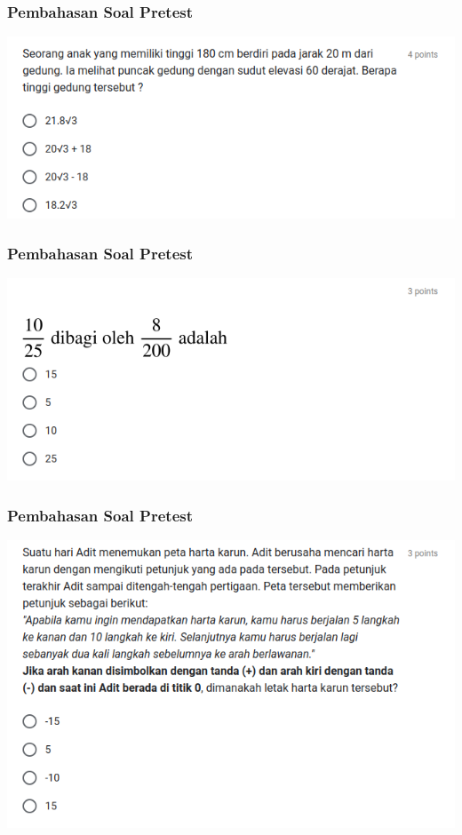 \documentclass[pdflatex,compress,mathserif]{beamer}
\begin{document}
	\begin{frame}
		\frametitle{Pembahasan Soal Pretest}
		\begin{center}
			\includegraphics[width=\linewidth]{img/img13}
		\end{center}
	\end{frame}
	
	\begin{frame}
		\frametitle{Pembahasan Soal Pretest}
		\begin{center}
			\includegraphics[width=\linewidth]{img/img14}
		\end{center}
	\end{frame}
	
	\begin{frame}
		\frametitle{Pembahasan Soal Pretest}
		\begin{center}
			\includegraphics[width=\linewidth]{img/img15}
		\end{center}
	\end{frame}
	
\end{document}
